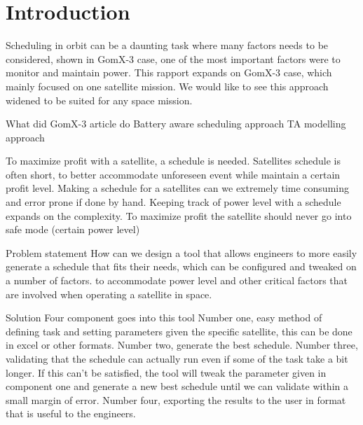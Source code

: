 \chapter{Introduction}\label{cha:intro}
Scheduling in orbit can be a daunting task where many factors needs to be considered, shown in GomX-3 case, one of the most important factors were to monitor and maintain power. This rapport expands on GomX-3 case, which mainly focused on one satellite mission. We would like to see this approach widened to be suited for any space mission.


What did GomX-3 article do
	Battery aware scheduling approach
		TA modelling approach

To maximize profit with a satellite, a schedule is needed.
	Satellites schedule is often short, to better accommodate unforeseen event while maintain a certain profit level.
	Making a schedule for a satellites can we extremely time consuming and error prone if done by hand.
	Keeping track of power level with a schedule expands on the complexity.
	To maximize profit the satellite should never go into safe mode (certain power level)
	
Problem statement
	How can we design a tool that allows engineers to more easily generate a schedule that fits their needs, which can be configured and tweaked on a number of factors. to accommodate power level and other critical factors that are involved when operating a satellite in space.

Solution
	Four component goes into this tool
	Number one, easy method of defining task and setting parameters given the specific satellite, this can be done in excel or other formats.
	Number two, generate the best schedule.
	Number three, validating that the schedule can actually run even if some of the task take a bit longer. If this can't be satisfied, the tool will tweak the parameter given in component one and generate a new best schedule until we can validate within a small margin of error.
	Number four, exporting the results to the user in format that is useful to the engineers.
